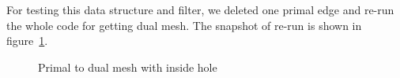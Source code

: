 \documentclass{InsightArticle}
\begin{document}
For testing this data structure and filter, we deleted one primal edge and re-run the whole code for getting dual mesh. The snapshot of re-run is shown in figure~\ref{fig:primal2DualMeshwithhole}.
\begin{figure}
	\centering
	\caption{Primal to dual mesh with inside hole}
\label{fig:primal2DualMeshwithhole}
\end{figure}
\end{document}
